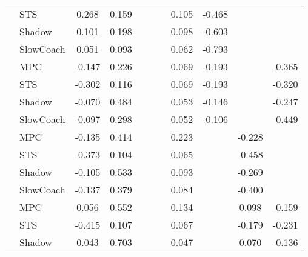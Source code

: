 \begin{tabular}{|l|l|*{9}{c|}}
                                                           & STS &    0.268 &     0.159 &        &     &     &  0.105 &  -0.468 &      &       \\
                                                           & Shadow &    0.101 &     0.198 &        &     &     &  0.098 &  -0.603 &      &       \\
                                                           & SlowCoach &    0.051 &     0.093 &        &     &     &  0.062 &  -0.793 &      &       \\
\midrule
[True, True, False, False, False, True, True, False, True] & MPC &   -0.147 &     0.226 &        &     &     &  0.069 &  -0.193 &      &   -0.365 \\
                                                           & STS &   -0.302 &     0.116 &        &     &     &  0.069 &  -0.193 &      &   -0.320 \\
                                                           & Shadow &   -0.070 &     0.484 &        &     &     &  0.053 &  -0.146 &      &   -0.247 \\
                                                           & SlowCoach &   -0.097 &     0.298 &        &     &     &  0.052 &  -0.106 &      &   -0.449 \\
\midrule
[True, True, False, False, False, True, False, True, False] & MPC &   -0.135 &     0.414 &        &     &     &  0.223 &      &  -0.228 &       \\
                                                           & STS &   -0.373 &     0.104 &        &     &     &  0.065 &      &  -0.458 &       \\
                                                           & Shadow &   -0.105 &     0.533 &        &     &     &  0.093 &      &  -0.269 &       \\
                                                           & SlowCoach &   -0.137 &     0.379 &        &     &     &  0.084 &      &  -0.400 &       \\
\midrule
[True, True, False, False, False, True, False, True, True] & MPC &    0.056 &     0.552 &        &     &     &  0.134 &      &   0.098 &   -0.159 \\
                                                           & STS &   -0.415 &     0.107 &        &     &     &  0.067 &      &  -0.179 &   -0.231 \\
                                                           & Shadow &    0.043 &     0.703 &        &     &     &  0.047 &      &   0.070 &   -0.136 \\

\end{tabular}
